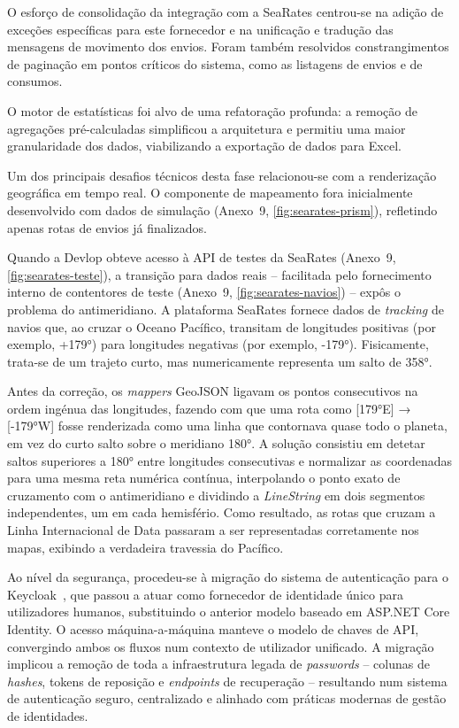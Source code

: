 \documentclass[a4paper,12pt]{report}
\begin{document}
O esforço de consolidação da integração com a SeaRates centrou-se na adição de exceções específicas para este fornecedor e na unificação e tradução das mensagens de movimento dos envios. Foram também resolvidos constrangimentos de paginação em pontos críticos do sistema, como as listagens de envios e de consumos.

O motor de estatísticas foi alvo de uma refatoração profunda: a remoção de agregações pré-calculadas simplificou a arquitetura e permitiu uma maior granularidade dos dados, viabilizando a exportação de dados para Excel.

Um dos principais desafios técnicos desta fase relacionou-se com a renderização geográfica em tempo real. O componente de mapeamento fora inicialmente desenvolvido com dados de simulação (Anexo~9, \autoref{fig:searates-prism}), refletindo apenas rotas de envios já finalizados.

Quando a Devlop obteve acesso à API de testes da SeaRates (Anexo~9, \autoref{fig:searates-teste}), a transição para dados reais -- facilitada pelo fornecimento interno de contentores de teste (Anexo~9, \autoref{fig:searates-navios}) -- expôs o problema do antimeridiano. A plataforma SeaRates fornece dados de \textit{tracking} de navios que, ao cruzar o Oceano Pacífico, transitam de longitudes positivas (por exemplo, +179°) para longitudes negativas (por exemplo, -179°). Fisicamente, trata-se de um trajeto curto, mas numericamente representa um salto de 358°.

Antes da correção, os \textit{mappers} GeoJSON ligavam os pontos consecutivos na ordem ingénua das longitudes, fazendo com que uma rota como [179°E] → [-179°W] fosse renderizada como uma linha que contornava quase todo o planeta, em vez do curto salto sobre o meridiano 180°. A solução consistiu em detetar saltos superiores a 180° entre longitudes consecutivas e normalizar as coordenadas para uma mesma reta numérica contínua, interpolando o ponto exato de cruzamento com o antimeridiano e dividindo a \textit{LineString} em dois segmentos independentes, um em cada hemisfério. Como resultado, as rotas que cruzam a Linha Internacional de Data passaram a ser representadas corretamente nos mapas, exibindo a verdadeira travessia do Pacífico.

Ao nível da segurança, procedeu-se à migração do sistema de autenticação para o Keycloak~\cite{keycloak}, que passou a atuar como fornecedor de identidade único para utilizadores humanos, substituindo o anterior modelo baseado em ASP.NET Core Identity. O acesso máquina-a-máquina manteve o modelo de chaves de API, convergindo ambos os fluxos num contexto de utilizador unificado. A migração implicou a remoção de toda a infraestrutura legada de \textit{passwords} -- colunas de \textit{hashes}, tokens de reposição e \textit{endpoints} de recuperação -- resultando num sistema de autenticação seguro, centralizado e alinhado com práticas modernas de gestão de identidades.
\end{document}
